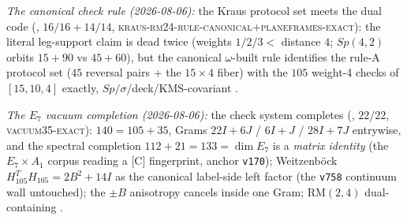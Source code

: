 \emph{The canonical check rule (2026-08-06):} the Kraus protocol
set meets the dual code
(, $16/16+14/14$,
\textsc{kraus-rm24-rule-canonical}$+$\textsc{planeframes-exact}):
the literal leg-support claim is dead twice (weights $1/2/3<$
distance $4$; $Sp(4,2)$ orbits $15{+}90$ vs $45{+}60$), but the
canonical $\omega$-built rule identifies the rule-A protocol set
($45$ reversal pairs $+$ the $15\times4$ fiber) with the $105$
weight-4 checks of $[15,10,4]$ exactly,
$Sp/\sigma$/deck/KMS-covariant \mE.

\emph{The $E_7$ vacuum completion (2026-08-06):} the check system
completes
(, $22/22$,
\textsc{vacuum35-exact}): $140=105+35$, Grams $22I{+}6J$ /
$6I{+}J$ / $28I{+}7J$ entrywise, and the spectral completion
$112+21=133=\dim E_7$ is a \emph{matrix identity} (the
$E_7\times A_1$ corpus reading a [C] fingerprint, anchor
\texttt{v170}); Weitzenb\"ock $H_{105}^TH_{105}=2B^2+14I$ as the
canonical label-side left factor (the \texttt{v758} continuum
wall untouched); the $\pm B$ anisotropy cancels inside one Gram;
$\mathrm{RM}(2,4)$ dual-containing \mE.

